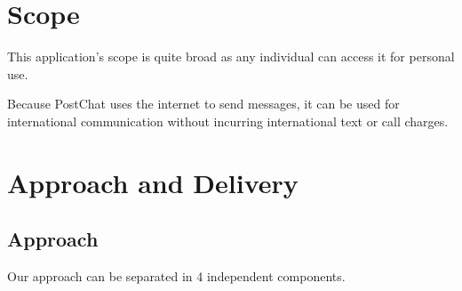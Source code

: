 \documentclass[11pt,a4paper]{article}
\begin{document}
	
	 
\section{Scope}
	This application's scope is quite broad as any individual can access it for personal use.\par
	Because PostChat uses the internet to send messages, it can be used for international communication without incurring international text or call charges.

\section{Approach and Delivery}
	\subsection{Approach}
	Our approach can be separated in 4 independent components. 
\end{document}
